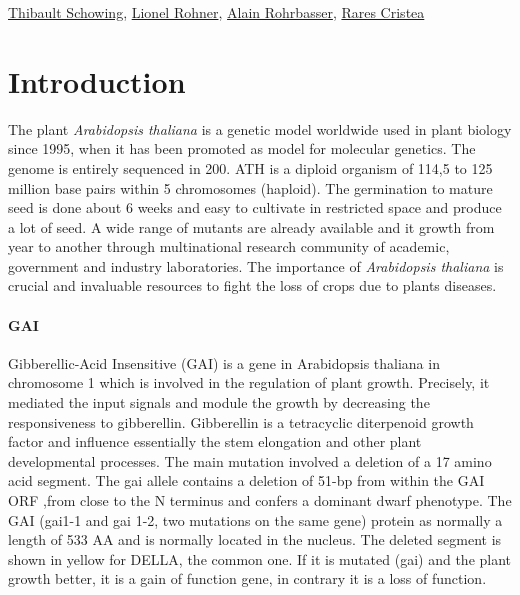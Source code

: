 \documentclass[10pt,a4paper]{article}
\begin{document}
\href{mailto:thibault.schowing@unifr.ch}{Thibault Schowing}, \href{mailto:lio_roh@students.unibe.ch}{Lionel Rohner},
\href{mailto:alain.rohrbasser.unifr.ch}{Alain Rohrbasser},
\href{mailto:rares.cristea@unifr.ch}{Rares Cristea}\\

\section*{\large Introduction}
The plant \textit{Arabidopsis thaliana} is a genetic model worldwide used in plant biology since 1995, when it has been promoted as model for molecular genetics. The genome is entirely sequenced in 200. ATH is a diploid organism of 114,5 to 125 million base pairs within 5 chromosomes (haploid). The germination to mature seed is done about 6 weeks and easy to cultivate in restricted space and produce a lot of seed. A wide range of mutants are already available and it growth from year to another through multinational research community of academic, government and industry laboratories. The importance of \textit{Arabidopsis thaliana} is crucial and invaluable resources to fight the loss of crops due to plants diseases.


%
%
%


\paragraph{GAI} 

Gibberellic-Acid Insensitive (GAI) is a gene in Arabidopsis thaliana in chromosome 1 
which is involved in the regulation of plant growth.  Precisely, it mediated the input 
signals and module the growth by decreasing the responsiveness to gibberellin\cite{peng_arabidopsis_1997}.
Gibberellin is a tetracyclic diterpenoid growth factor and influence essentially the stem 
elongation and other plant developmental processes\cite{hooley_gibberellins:_nodate}.
The main mutation involved a deletion of a 17 amino acid segment. The gai allele contains
a deletion of 51-bp from within the GAI ORF ,from close to the N terminus and confers a 
dominant dwarf phenotype. The GAI (gai1-1 and gai 1-2, two mutations on the same gene)
protein as normally a length of 533 AA and is normally located in the nucleus. The deleted segment is shown in yellow for DELLA,
the common one\cite{peng_arabidopsis_1997,lee_gibberellin_2002}.
If it is mutated (gai) and the plant growth better, it is a gain of function gene, in contrary it is a loss of function. \\
\end{document}
